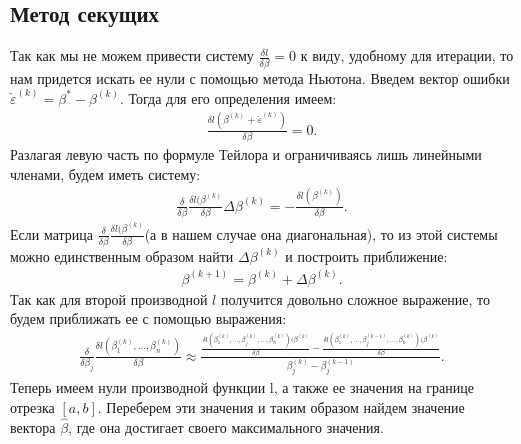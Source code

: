 \documentclass[12pt]{article}
\begin{document}
\subsection{Метод секущих}
Так как мы не можем привести систему $ \frac{\delta l}{\delta \beta}=0$ к виду, удобному для итерации, то нам придется искать ее нули с помощью метода Ньютона.
Введем вектор ошибки $\check{\varepsilon}^{(k)}=\beta^{*}-\beta^{(k)}$. Тогда для его определения имеем:
\begin{eqnarray}
    \frac{\delta l (\beta^{(k)}+\check{\varepsilon}^{(k)})}{\delta \beta}=0.
\end{eqnarray}
Разлагая левую часть по формуле Тейлора и ограничиваясь лишь линейными членами\cite{NumericalMethods}, будем иметь систему:
\begin{eqnarray}
    \frac{\delta }{\delta \beta}\frac{\delta l (\beta^{(k)}}{\delta \beta}\Delta \beta^{(k)}=-\frac{\delta l (\beta^{(k)})}{\delta \beta}.
\end{eqnarray}
Если матрица $\frac{\delta }{\delta \beta}\frac{\delta l (\beta^{(k)}}{\delta \beta}$(а в нашем случае она диагональная), то из этой системы можно единственным образом найти $\Delta \beta^{(k)}$ и построить приближение:
\begin{eqnarray}
    \beta^{(k+1)}=\beta^{(k)}+\Delta \beta^{(k)}.
\end{eqnarray}
Так как для второй производной $l$ получится довольно сложное выражение, то будем приближать ее с помощью выражения:
\begin{eqnarray}
    \frac{\delta }{\delta \beta_j}\frac{\delta l(\beta_1^{(k)},\dots, \beta_n^{(k)}) }{\delta \beta}\approx \frac{\frac{\delta l(\beta_1^{(k)},\dots,\beta_j^{(k)},\dots, \beta_n^{(k)}) (\beta^{(k)}}{\delta \beta}-\frac{\delta l(\beta_1^{(k)},\dots,\beta_j^{(k-1)},\dots, \beta_n^{(k)}) (\beta^{(k)}}{\delta \beta}}{\beta_j^{(k)}-\beta_j^{(k-1)}}.
\end{eqnarray}
Теперь имеем нули производной функции l, а также ее значения на границе отрезка $[a,b]$.
Переберем эти значения и таким образом найдем значение вектора $\hat{\beta}$, где она достигает своего максимального значения.
\end{document}
